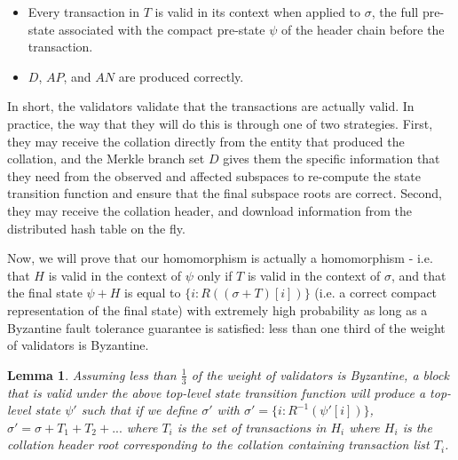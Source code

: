 \documentclass[11pt,a4paper]{article}
\makeatletter
\theoremstyle{plain}
\newtheorem{lem}[thm]{Lemma}
\theoremstyle{definition}
\theoremstyle{remark}
\newcommand{\ie}{i.e.\@\xspace}
\makeatother
\begin{document}
\begin{itemize}
\item
Every transaction in $T$ is valid in its context when applied to $\sigma$, the full pre-state associated with the compact pre-state $\psi$ of the header chain before the transaction.
\item
$D$, $AP$, and $AN$ are produced correctly.
\end{itemize}

In short, the validators validate that the transactions are actually valid. In practice, the way that they will do this is through one of two strategies. First, they may receive the collation directly from the entity that produced the collation, and the Merkle branch set $D$ gives them the specific information that they need from the observed and affected subspaces to re-compute the state transition function and ensure that the final subspace roots are correct. Second, they may receive the collation header, and download information from the distributed hash table on the fly.

Now, we will prove that our homomorphism is actually a homomorphism - \ie that $H$ is valid in the context of $\psi$ only if $T$ is valid in the context of $\sigma$, and that the final state $\psi + H$ is equal to $\{i: R((\sigma + T)[i])\}$ (\ie a correct compact representation of the final state) with extremely high probability as long as a Byzantine fault tolerance guarantee is satisfied: less than one third of the weight of validators is Byzantine. 

\begin{lem}
Assuming less than $\frac{1}{3}$ of the weight of validators is Byzantine, a block that is valid under the above top-level state transition function will produce a top-level state $\psi'$ such that if we define $\sigma'$ with $\sigma' = \{i: R^{-1}(\psi'[i])\}$, $\sigma' = \sigma + T_1 + T_2 + ...$ where $T_i$ is the set of transactions in $H_i$ where $H_i$ is the collation header root corresponding to the collation containing transaction list $T_i$.
\end{lem}
\end{document}

